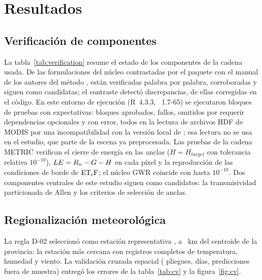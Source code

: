 \section{Resultados}\label{sec:results}

\subsection{Verificación de componentes}\label{sec:res-verif}

La tabla~\ref{tab:verification} resume el estado de los componentes de la
cadena usada. De las \VerRows{} formulaciones del núcleo contrastadas por el
paquete con el manual de los autores del método \parencite{waters2002sebal},
\VerVerified{} están verificadas palabra por palabra, \VerCorroborated{}
corroboradas y \VerCandidate{} siguen como candidatas; el contraste detectó
\VerDiscrepancies{} discrepancias, \VerFixed{} de ellas corregidas en el
código. En este entorno de ejecución (R~4.3.3, ~1.7-65) se
ejecutaron \NTests{} bloques de pruebas con \NExpectations{} expectativas:
\NTestsPassed{} bloques aprobados, \NTestsFailed{} fallos, \NTestsSkipped{}
omitidos por requerir dependencias opcionales y \NTestsError{} con error,
todos en la lectura de archivos HDF de MODIS por una incompatibilidad con
la versión local de ; esa lectura no se usa en el estudio, que
parte de la escena ya preprocesada. Las pruebas de la cadena METRIC verifican
el cierre de energía en las anclas ($H = H_{target}$ con tolerancia relativa
$10^{-10}$), $LE = R_n - G - H$ en cada píxel y la reproducción de las
condiciones de borde de $\mathrm{ET_rF}$; el núcleo GWR coincide con 
hasta $10^{-10}$. Dos componentes centrales de este estudio siguen como
candidatos: la transmisividad particionada de Allen y los criterios de
selección de anclas.

\begin{table}[htbp]
\centering\footnotesize
\caption{Componentes de la cadena METRIC usada, estado de verificación y
pruebas (fuente: \texttt{config/verification\_map.csv} y
\texttt{dev/VERIFICATION.md} del paquete).}\label{tab:verification}

\end{table}

\subsection{Regionalización meteorológica}\label{sec:res-reg}

La regla D-02 seleccionó como estación representativa
\emph{\RepStationName}, a \RepStationDist{}~km del centroide de la provincia: la estación más
cercana con registros completos de temperatura, humedad y viento. La validación
cruzada espacial (\NFolds{} pliegues, \NCVDays{} días, \NCVPred
predicciones fuera de muestra) entregó los errores de la tabla~\ref{tab:cv}
y la figura~\ref{fig:cv}.

